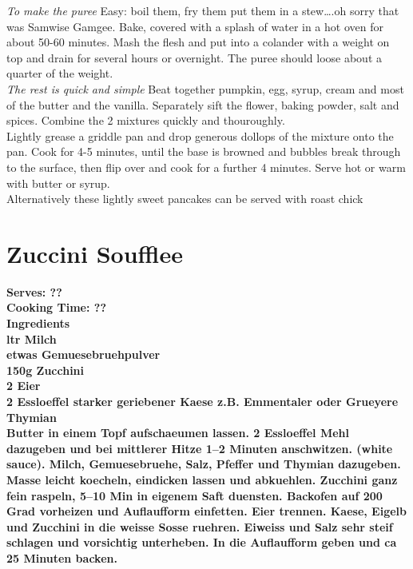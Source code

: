 \documentclass[18pt, oneside]{book}
\begin{document}
\textit{To make the puree}
Easy: boil them, fry them put them in a stew….oh sorry that was Samwise Gamgee. Bake, covered with a splash of water in a hot oven for about 50-60 minutes. Mash the flesh and put into a colander with a weight on top and drain for several hours or overnight. The puree should loose about a quarter of the weight. \\


\textit{The rest is quick and simple}
Beat together pumpkin, egg, syrup, cream and most of the butter and the vanilla. Separately sift the flower, baking powder, salt and spices. Combine the 2 mixtures quickly and thouroughly.\\

Lightly grease a griddle pan and drop generous dollops of the mixture onto the pan. Cook for 4-5 minutes, until the base is browned and bubbles break through to  the surface, then flip over and cook for a further 4 minutes. 
Serve hot or warm with butter or syrup.\\

Alternatively these lightly sweet pancakes can be served with roast chick


\section{Zuccini Soufflee}
\bf{Serves: ??} \\
\bf{Cooking Time: ??} \\

\bf{Ingredients} \normalfont \\ 
 ltr Milch \\
etwas Gemuesebruehpulver \\
150g Zucchini \\ 
2 Eier \\
2 Essloeffel starker geriebener Kaese z.B. Emmentaler oder Grueyere Thymian \\

Butter in einem Topf aufschaeumen lassen. 2 Essloeffel Mehl dazugeben und bei mittlerer Hitze 1--2 Minuten anschwitzen. (white sauce). Milch, Gemuesebruehe, Salz, Pfeffer und Thymian dazugeben. Masse leicht koecheln, eindicken lassen und abkuehlen. Zucchini ganz fein raspeln, 5--10 Min in eigenem Saft duensten. Backofen auf 200 Grad vorheizen und Auflaufform einfetten. Eier trennen. Kaese, Eigelb und Zucchini in die weisse Sosse ruehren. Eiweiss und Salz sehr steif  schlagen und vorsichtig unterheben. In die Auflaufform geben und ca 25 Minuten backen.
\end{document}
